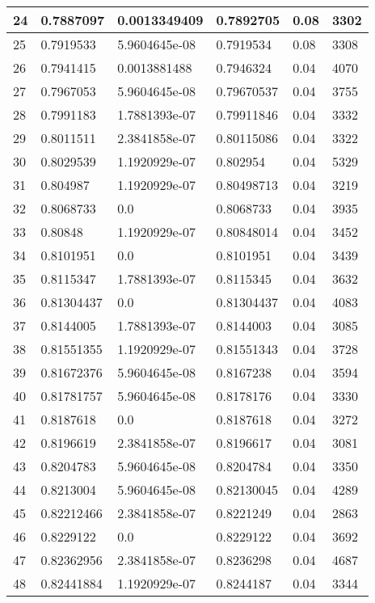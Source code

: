 \begin{longtable}{|l|l|l|l|l|l|}
24 & 0.7887097 & 0.0013349409 & 0.7892705 & 0.08 & 3302 \\ \hline 
25 & 0.7919533 & 5.9604645e-08 & 0.7919534 & 0.08 & 3308 \\ \hline 
26 & 0.7941415 & 0.0013881488 & 0.7946324 & 0.04 & 4070 \\ \hline 
27 & 0.7967053 & 5.9604645e-08 & 0.79670537 & 0.04 & 3755 \\ \hline 
28 & 0.7991183 & 1.7881393e-07 & 0.79911846 & 0.04 & 3332 \\ \hline 
29 & 0.8011511 & 2.3841858e-07 & 0.80115086 & 0.04 & 3322 \\ \hline 
30 & 0.8029539 & 1.1920929e-07 & 0.802954 & 0.04 & 5329 \\ \hline 
31 & 0.804987 & 1.1920929e-07 & 0.80498713 & 0.04 & 3219 \\ \hline 
32 & 0.8068733 & 0.0 & 0.8068733 & 0.04 & 3935 \\ \hline 
33 & 0.80848 & 1.1920929e-07 & 0.80848014 & 0.04 & 3452 \\ \hline 
34 & 0.8101951 & 0.0 & 0.8101951 & 0.04 & 3439 \\ \hline 
35 & 0.8115347 & 1.7881393e-07 & 0.8115345 & 0.04 & 3632 \\ \hline 
36 & 0.81304437 & 0.0 & 0.81304437 & 0.04 & 4083 \\ \hline 
37 & 0.8144005 & 1.7881393e-07 & 0.8144003 & 0.04 & 3085 \\ \hline 
38 & 0.81551355 & 1.1920929e-07 & 0.81551343 & 0.04 & 3728 \\ \hline 
39 & 0.81672376 & 5.9604645e-08 & 0.8167238 & 0.04 & 3594 \\ \hline 
40 & 0.81781757 & 5.9604645e-08 & 0.8178176 & 0.04 & 3330 \\ \hline 
41 & 0.8187618 & 0.0 & 0.8187618 & 0.04 & 3272 \\ \hline 
42 & 0.8196619 & 2.3841858e-07 & 0.8196617 & 0.04 & 3081 \\ \hline 
43 & 0.8204783 & 5.9604645e-08 & 0.8204784 & 0.04 & 3350 \\ \hline 
44 & 0.8213004 & 5.9604645e-08 & 0.82130045 & 0.04 & 4289 \\ \hline 
45 & 0.82212466 & 2.3841858e-07 & 0.8221249 & 0.04 & 2863 \\ \hline 
46 & 0.8229122 & 0.0 & 0.8229122 & 0.04 & 3692 \\ \hline 
47 & 0.82362956 & 2.3841858e-07 & 0.8236298 & 0.04 & 4687 \\ \hline 
48 & 0.82441884 & 1.1920929e-07 & 0.8244187 & 0.04 & 3344 \\ \hline 

\end{longtable}
